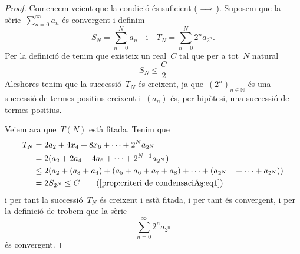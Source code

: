 \documentclass[../../main.tex]{subfiles}
\begin{document}
    \begin{proof}
        Comencem veient que la condició és suficient (\(\implies\)).
        Suposem que la sèrie~\(\sum_{n=0}^{\infty}a_{n}\) és convergent i definim
        \[
            S_{N}=\sum_{n=0}^{N}a_{n}\quad\text{i}\quad T_{N}=\sum_{n=0}^{N}2^{n}a_{2^{n}}.
        \]
        Per la definició de  tenim que existeix un real~\(C\) tal que per a tot~\(N\) natural
        \begin{equation}
            \label{prop:criteri de condensació:eq1}
            S_{N}\leq\frac{C}{2}
        \end{equation}
        Aleshores tenim que la successió~\(T_{N}\) és creixent, ja que~\((2^{n})_{n\in\mathbb{N}}\) és una successió de termes positius creixent i~\((a_{n})\) és, per hipòtesi, una successió de termes positius.

        Veiem ara que~\(T(N)\) està fitada.
        Tenim que
        \begin{align*}
            T_{N}&=2a_{2}+4x_{4}+8x_{6}+\dots+2^{N}a_{2^{N}} \\
            &=2(a_{2}+2a_{4}+4a_{6}+\dots+2^{N-1}a_{2^{N}}) \\
            &\leq2\left(a_{2}+(a_{3}+a_{4})+(a_{5}+a_{6}+a_{7}+a_{8})+\dots+(a_{2^{N-1}}+\dots+a_{2^{N}})\right) \\
            &=2S_{2^{N}}\leq C \tag{\ref{prop:criteri de condensació:eq1}}
        \end{align*}
        i per tant la successió~\(T_{N}\) és creixent i està fitada, i per tant és convergent, i per la definició de  trobem que la sèrie
        \[
            \sum_{n=0}^{\infty}2^{n}a_{2^{n}}
        \]
        és convergent.


\end{proof}
\end{document}
